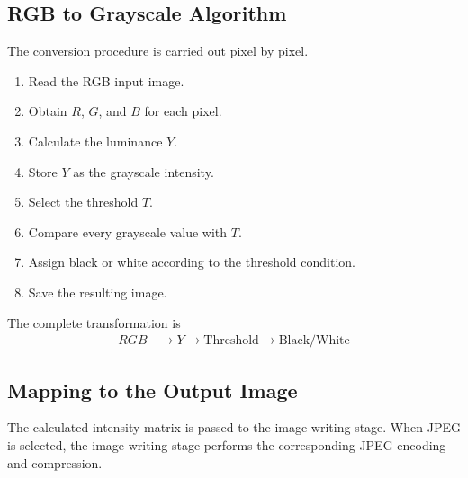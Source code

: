 \subsection{RGB to Grayscale Algorithm}

The conversion procedure is carried out pixel by pixel.

\begin{enumerate}
\item Read the RGB input image.
\item Obtain $R$, $G$, and $B$ for each pixel.
\item Calculate the luminance $Y$.
\item Store $Y$ as the grayscale intensity.
\item Select the threshold $T$.
\item Compare every grayscale value with $T$.
\item Assign black or white according to the threshold condition.
\item Save the resulting image.
\end{enumerate}

The complete transformation is
\begin{align}
RGB &\rightarrow Y \rightarrow \text{Threshold}
\rightarrow \text{Black/White}\label{eq:rgb_bw_pipeline}
\end{align}
\vspace*{\baselineskip}
\subsection{Mapping to the Output Image}

The calculated intensity matrix is passed to the image-writing stage.
When JPEG is selected, the image-writing stage performs the
corresponding JPEG encoding and compression.
